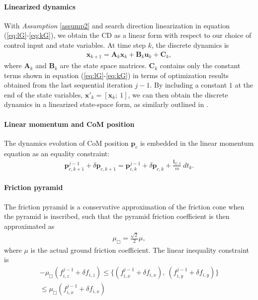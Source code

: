 \paragraph{Linearized dynamics}
With \textit{Assumption} \ref{assump2} and search direction linearization in equation (\ref{eq:lG}-\ref{eq:kG}), we obtain the CD as a linear form with respect to our choice of control input and state variables. At time step $k$, the discrete dynamics is 
\begin{align}
\label{eq:cdlinear}
    \bm x_{k+1} = \mathbf A_k \bm x_{k} + \mathbf B_k \bm u_k + \mathbf C_k,
\end{align}
where $\mathbf A_k$ and $\mathbf B_k$ are the state space matrices. $\mathbf C_k$ contains only the constant terms shown in equation (\ref{eq:lG}-\ref{eq:kG}) in terms of optimization results obtained from the last sequential iteration $j-1$. By including a constant $1$ at the end of the state variables, $\bm x'_{k} = [\bm x_{k};\:1]$, we can then obtain the discrete dynamics in a linearized state-space form, as similarly outlined in \cite{di2018dynamic,chen2024learning}.

\paragraph{Linear momentum and CoM position}
The dynamics evolution of CoM position $\bm p_c$ is embedded in the linear momentum equation as an equality constraint:
\begin{align}
    \bm p^{j-1}_{c,k+1} +\delta \bm p_{c,k+1}  = \bm p^{j-1}_{c,k} +\delta \bm p_{c,k} + \frac{\bm l_{G,k}}{m}\:dt_k.
\end{align}

\paragraph{Friction pyramid}
The friction pyramid is a conservative approximation of the friction cone when the pyramid is inscribed, such that the pyramid friction coefficient is then approximated as 
\begin{align}
    \mu_{\Box} = \frac{\sqrt{2}}{2}\mu,
\end{align}
where $\mu$ is the actual ground friction coefficient. The linear inequality constraint is
\begin{align}
    \nonumber 
    -\mu_{\Box}  ({f}_{i,z}^{j-1}+\delta f_{i,z}) \leq  \big\{({f}_{i,x}^{j-1}+\delta f_{i,x}), 
    \: ({f}_{i,y}^{j-1}+\delta f_{i,y})\bigr\} \\
    \leq \mu_{\Box}  ({f}_{i,x}^{j-1}+\delta f_{i,x}) \quad \quad
    \label{eq:frictionCons}
\end{align}

